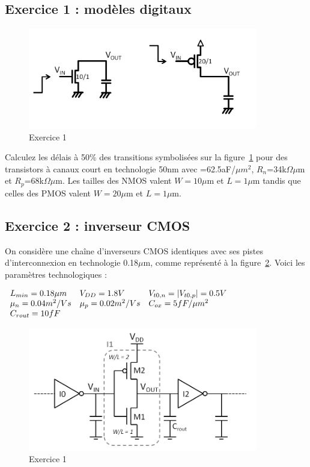 \subsection*{Exercice 1 : modèles digitaux}

\begin{figure}[!htbp]
   \centering
   \includegraphics[width=10cm]{figure/fig7-1.png}
   \caption{Exercice 1}
   \label{fig7-1}
\end{figure}

Calculez les délais à 50\% des transitions symbolisées sur la figure~\ref{fig7-1}
pour des transistors à canaux court en technologie 50nm avec \cox=62.5aF/$\mu m^2$,
$R_n$=34k$\Omega\mu$m et $R_p$=68k$\Omega\mu$m.
Les tailles des NMOS valent $W=10\mu$m et $L=1\mu$m tandis que celles des PMOS valent
$W=20\mu$m et $L=1\mu$m.

\subsection*{Exercice 2 : inverseur CMOS}

On considère une chaîne d'inverseurs CMOS identiques avec ses pistes d'interconnexion
en technologie 0.18$\mu$m, comme représenté à la figure~\ref{fig7-2}. Voici les paramètres
technologiques :

\begin{center}
$
	\begin{array}{l l l}
		L_{min} = 0.18 \mu m 	& V_{DD} = 1.8 V 		& V_{t0,n} = |V_{t0,p} | = 0.5 V \\
		\mu_n = 0.04 m^2/Vs 	& \mu_p = 0.02 m^2/Vs	& C_{ox} = 5 fF/\mu m^2 \\
		C_{rout} = 10fF			&						& \\
	\end{array}
$
\end{center}

\begin{figure}[!htbp]
   \centering
   \includegraphics[width=10cm]{figure/fig7-2.png}
   \caption{Exercice 1}
   \label{fig7-2}
\end{figure}

